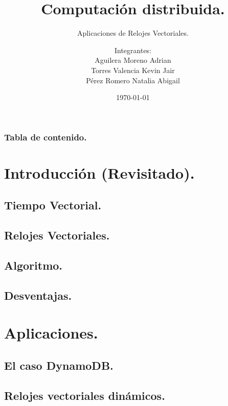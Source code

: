 \documentclass[9pt]{beamer}
\title{Computación distribuida.}
\subtitle{Aplicaciones de Relojes Vectoriales.}
\author{Integrantes:\\
        Aguilera Moreno Adrian\\
        Torres Valencia Kevin Jair\\
        Pérez Romero Natalia Abigail}
\institute{Facultad de Ciencias, UNAM}
\date{\today}
\begin{document}
\titlepage

\begin{frame}
 \frametitle{Tabla de contenido.}
 \tableofcontents
\end{frame}

\section{Introducción (Revisitado).}


\subsection{Tiempo Vectorial.}


\subsection{Relojes Vectoriales.}


\def\beamer@mytheme@style{green}

\subsection{Algoritmo.}

\subsection{Desventajas.}


\section{Aplicaciones.}
\subsection{El caso DynamoDB.}
\subsection{Relojes vectoriales dinámicos.}


\end{document}
